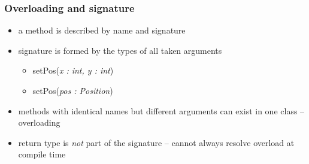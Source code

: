 \documentclass[UTF8]{beamer}
\begin{document}
\begin{frame}
  \frametitle{Overloading and signature}

  \begin{center}
  \end{center}

  \begin{itemize}
  \item a method is described by name and \alert{signature}
  \item signature is formed by the types of all taken arguments
    \begin{itemize}
    \item setPos(\emph{x : int, y : int})\\
    \item setPos(\emph{pos : Position})
    \end{itemize}
  \item methods with identical names but different arguments can exist in one class -- \alert{overloading}
  \item return type is \emph{not} part of the signature -- cannot always resolve overload at compile time

  \end{itemize}
\end{frame}
\end{document}
